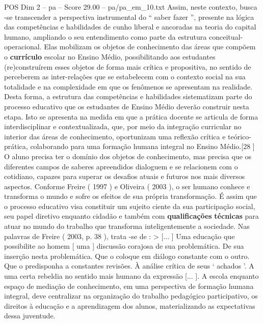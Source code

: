 \begin{textsample}{POS Dim 2 – pa – Score 29.00 – pa/pa\_em\_10.txt}
Assim, neste contexto, busca -se transcender a perspectiva instrumental do “ saber fazer ”, presente na lógica das competências e habilidades de cunho liberal e ancoradas na teoria do capital humano, ampliando o seu entendimento como parte da estrutura conceitual-operacional.
Elas mobilizam os objetos de conhecimento das áreas que compõem o \textbf{currículo} escolar no Ensino Médio, possibilitando aos estudantes (re)construírem esses objetos de forma mais crítica e propositiva, no sentido de perceberem as inter-relações que se estabelecem com o contexto social na sua totalidade e na complexidade em que os fenômenos se apresentam na realidade.
Desta forma, a estrutura das competências e habilidades sistematizam parte do processo educativo que os estudantes de Ensino Médio deverão construir nesta etapa.
Isto se apresenta na medida em que a prática docente se articula de forma interdisciplinar e contextualizada, que, por meio da integração curricular no interior das áreas de conhecimento, oportunizam uma reflexão crítica e teórico-prática, colaborando para uma formação humana integral no Ensino Médio.[28 ] O aluno precisa ter o domínio dos objetos de conhecimento, mas precisa que os diferentes campos de saberes apreendidos dialoguem e se relacionem com o cotidiano, capazes para superar os desafios atuais e futuros nos mais diversos aspectos.
Conforme Freire ( 1997 ) e Oliveira ( 2003 ), o ser humano conhece e transforma o mundo e sofre os efeitos de sua própria transformação.
É assim que o processo educativo visa constituir um sujeito ciente da sua participação social, seu papel diretivo enquanto cidadão e também com \textbf{qualificações} \textbf{técnicas} para atuar no mundo do trabalho que transforma inteligentemente a sociedade.
Nas palavras de Freire ( 2003, p. 38 ), trata -se de : > [... ] Uma educação que possibilite ao homem [ uma ] discussão corajosa de sua problemática.
De sua inserção nesta problemática.
Que o coloque em diálogo constante com o outro.
Que o predisponha a constantes revisões.
À análise crítica de seus ‘ achados ’.
A uma certa rebeldia no sentido mais humano da expressão [... ].
A escola enquanto espaço de mediação de conhecimento, em uma perspectiva de formação humana integral, deve centralizar na organização do trabalho pedagógico participativo, os direitos à educação e a aprendizagem dos alunos, materializando as expectativas dessa juventude.

\end{textsample}
